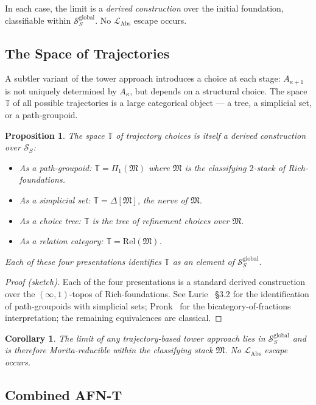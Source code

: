 \documentclass[11pt]{article}
\theoremstyle{plain}
\newtheorem{proposition}[theorem]{Proposition}
\newtheorem{corollary}[theorem]{Corollary}
\theoremstyle{definition}
\newcommand{\cS}{\mathcal{S}}
\newcommand{\fM}{\mathfrak{M}}
\newcommand{\LAbs}{\mathcal{L}_{\mathrm{Abs}}}
\begin{document}
In each case, the limit is a \emph{derived construction} over the initial foundation, classifiable within $\cS_S^{\mathrm{global}}$. No $\LAbs$ escape occurs.

\subsection{The Space of Trajectories}

A subtler variant of the tower approach introduces a choice at each stage: $A_{\kappa+1}$ is not uniquely determined by $A_\kappa$, but depends on a structural choice. The space $\mathbb{T}$ of all possible trajectories is a large categorical object --- a tree, a simplicial set, or a path-groupoid.

\begin{proposition}\label{prop:trajectory-space}
The space $\mathbb{T}$ of trajectory choices is itself a derived construction over $\cS_S$:
\begin{itemize}
\item As a path-groupoid: $\mathbb{T} = \Pi_1(\fM)$ where $\fM$ is the classifying $2$-stack of Rich-foundations.
\item As a simplicial set: $\mathbb{T} = \Delta[\fM]$, the nerve of $\fM$.
\item As a choice tree: $\mathbb{T}$ is the tree of refinement choices over $\fM$.
\item As a relation category: $\mathbb{T} = \mathrm{Rel}(\fM)$.
\end{itemize}
Each of these four presentations identifies $\mathbb{T}$ as an element of $\cS_S^{\mathrm{global}}$.
\end{proposition}

\begin{proof}[Proof (sketch)]
Each of the four presentations is a standard derived construction over the $(\infty, 1)$-topos of Rich-foundations. See Lurie~\cite{LurieHTT} \S 3.2 for the identification of path-groupoids with simplicial sets; Pronk~\cite{Pronk1996} for the bicategory-of-fractions interpretation; the remaining equivalences are classical.
\end{proof}

\begin{corollary}
The limit of any trajectory-based tower approach lies in $\cS_S^{\mathrm{global}}$ and is therefore Morita-reducible within the classifying stack $\fM$. No $\LAbs$ escape occurs.
\end{corollary}

\subsection{Combined AFN-T}
\end{document}
